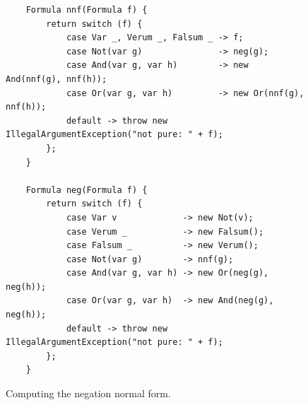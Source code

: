 \begin{figure}[!ht]
  \centering
\begin{verbatim}
    Formula nnf(Formula f) {
        return switch (f) {
            case Var _, Verum _, Falsum _ -> f;
            case Not(var g)               -> neg(g);
            case And(var g, var h)        -> new And(nnf(g), nnf(h));
            case Or(var g, var h)         -> new Or(nnf(g), nnf(h));
            default -> throw new IllegalArgumentException("not pure: " + f);
        };
    }
    
    Formula neg(Formula f) {
        return switch (f) {
            case Var v             -> new Not(v);
            case Verum _           -> new Falsum();
            case Falsum _          -> new Verum();
            case Not(var g)        -> nnf(g);
            case And(var g, var h) -> new Or(neg(g), neg(h));
            case Or(var g, var h)  -> new And(neg(g), neg(h));
            default -> throw new IllegalArgumentException("not pure: " + f);
        };
    }
\end{verbatim}
\vspace*{-0.3cm}
  \caption{Computing the negation normal form.}
  \label{fig:nnf}
\end{figure}


